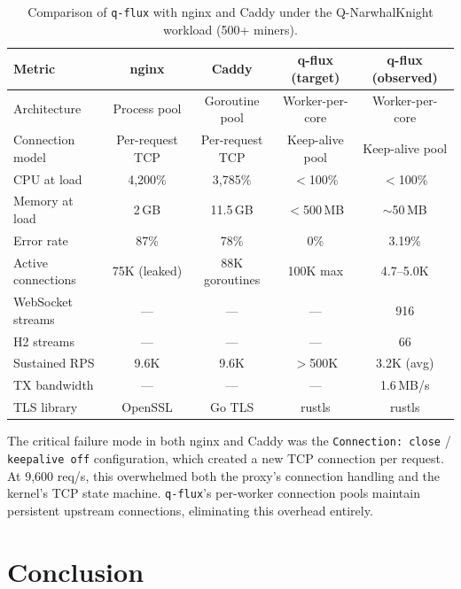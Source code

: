 \documentclass[a4paper, 11pt]{article}
\newcommand{\qflux}{\texttt{q-flux}}
\begin{document}
\begin{table}[H]
\centering
\caption{Comparison of \qflux{} with nginx and Caddy under the
Q-NarwhalKnight workload (500+ miners).}
\label{tab:comparison}
\begin{tabular}{@{}lcccc@{}}
\toprule
\textbf{Metric} & \textbf{nginx} & \textbf{Caddy} & \textbf{q-flux (target)} & \textbf{q-flux (observed)} \\
\midrule
Architecture        & Process pool    & Goroutine pool  & Worker-per-core & Worker-per-core \\
Connection model    & Per-request TCP & Per-request TCP  & Keep-alive pool & Keep-alive pool \\
CPU at load         & 4,200\%         & 3,785\%         & $<$100\%   & $<$100\% \\
Memory at load      & 2\,GB           & 11.5\,GB        & $<$500\,MB & $\sim$50\,MB \\
Error rate          & 87\%            & 78\%            & 0\%        & 3.19\% \\
Active connections  & 75K (leaked)    & 88K goroutines  & 100K max   & 4.7--5.0K \\
WebSocket streams   & ---             & ---             & ---        & 916 \\
H2 streams          & ---             & ---             & ---        & 66 \\
Sustained RPS       & 9.6K            & 9.6K            & $>$500K    & 3.2K (avg) \\
TX bandwidth        & ---             & ---             & ---        & 1.6\,MB/s \\
TLS library         & OpenSSL         & Go TLS          & rustls     & rustls \\
\bottomrule
\end{tabular}
\end{table}

The critical failure mode in both nginx and Caddy was the
\texttt{Connection: close} / \texttt{keepalive off} configuration,
which created a new TCP connection per request.  At 9,600 req/s,
this overwhelmed both the proxy's connection handling and the
kernel's TCP state machine.  \qflux{}'s per-worker connection pools
maintain persistent upstream connections, eliminating this overhead
entirely.


\section{Conclusion}
\end{document}
